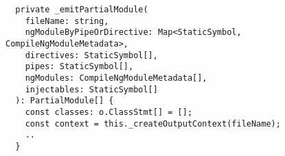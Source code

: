 \begin{verbatim}
  private _emitPartialModule(
    fileName: string,
    ngModuleByPipeOrDirective: Map<StaticSymbol, CompileNgModuleMetadata>,
    directives: StaticSymbol[],
    pipes: StaticSymbol[],
    ngModules: CompileNgModuleMetadata[],
    injectables: StaticSymbol[]
  ): PartialModule[] {
    const classes: o.ClassStmt[] = [];
    const context = this._createOutputContext(fileName);
    ..
  }
\end{verbatim}
